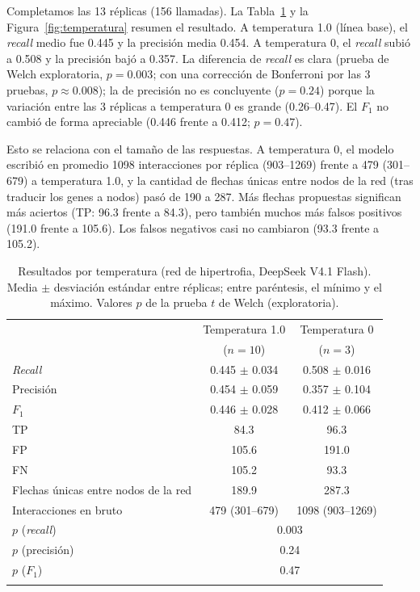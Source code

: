 \documentclass[unnumsec,webpdf,contemporary,large]{oup-authoring-template}
\begin{document}
Completamos las 13 réplicas (156 llamadas). La Tabla~\ref{tab:temperatura} y la Figura~\ref{fig:temperatura} resumen el resultado. A temperatura 1.0 (línea base), el \emph{recall} medio fue 0.445 y la precisión media 0.454. A temperatura 0, el \emph{recall} subió a 0.508 y la precisión bajó a 0.357. La diferencia de \emph{recall} es clara (prueba de Welch exploratoria, $p=0.003$; con una corrección de Bonferroni por las 3 pruebas, $p\approx0.008$); la de precisión no es concluyente ($p=0.24$) porque la variación entre las 3 réplicas a temperatura 0 es grande (0.26--0.47). El $F_1$ no cambió de forma apreciable (0.446 frente a 0.412; $p=0.47$).

Esto se relaciona con el tamaño de las respuestas. A temperatura 0, el modelo escribió en promedio 1098 interacciones por réplica (903--1269) frente a 479 (301--679) a temperatura 1.0, y la cantidad de flechas únicas entre nodos de la red (tras traducir los genes a nodos) pasó de 190 a 287. Más flechas propuestas significan más aciertos (TP: 96.3 frente a 84.3), pero también muchos más falsos positivos (191.0 frente a 105.6). Los falsos negativos casi no cambiaron (93.3 frente a 105.2).

\begin{table}[t]
\caption{Resultados por temperatura (red de hipertrofia, DeepSeek V4.1 Flash). Media $\pm$ desviación estándar entre réplicas; entre paréntesis, el mínimo y el máximo. Valores $p$ de la prueba $t$ de Welch (exploratoria).\label{tab:temperatura}}
\begin{tabular*}{\columnwidth}{@{\extracolsep\fill}lcc@{}}
\toprule
 & Temperatura 1.0 & Temperatura 0 \\
 & ($n=10$) & ($n=3$) \\
\midrule
\emph{Recall} & 0.445 $\pm$ 0.034 & 0.508 $\pm$ 0.016 \\
Precisión & 0.454 $\pm$ 0.059 & 0.357 $\pm$ 0.104 \\
$F_1$ & 0.446 $\pm$ 0.028 & 0.412 $\pm$ 0.066 \\
TP & 84.3 & 96.3 \\
FP & 105.6 & 191.0 \\
FN & 105.2 & 93.3 \\
Flechas únicas entre nodos de la red & 189.9 & 287.3 \\
Interacciones en bruto & 479 (301--679) & 1098 (903--1269) \\
\midrule
$p$ (\emph{recall}) & \multicolumn{2}{c}{0.003} \\
$p$ (precisión) & \multicolumn{2}{c}{0.24} \\
$p$ ($F_1$) & \multicolumn{2}{c}{0.47} \\
\botrule
\end{tabular*}
\end{table}
\end{document}
